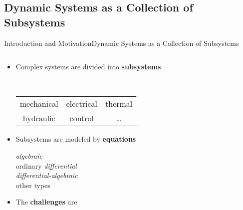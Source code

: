 \subsection{Dynamic Systems as a Collection of Subsystems}

\begin{frame}{Introduction and Motivation}{Dynamic Systems as a Collection of Subsystems}
  \begin{columns}
    \begin{column}[c]{0.6\textwidth}
      \begin{itemize}
        \item<1-> Complex systems are divided into \textbf{subsystems} \\
        \begin{small}
          \quad\, \begin{tabular}{ccc}
            \raisebox{-1pt}{\scalebox{0.8}{\textcolor{fg_sl_color}{\faCogs}}} mechanical &
            \raisebox{-1pt}{\scalebox{0.8}{\textcolor{fg_sl_color}{\faBolt}}} electrical &
            \raisebox{-1pt}{\scalebox{0.8}{\textcolor{fg_sl_color}{\faFire}}} thermal \\
            \raisebox{-1pt}{\scalebox{0.8}{\textcolor{fg_sl_color}{\faOilCan}}} hydraulic &
            \raisebox{-1pt}{\scalebox{0.8}{\textcolor{fg_sl_color}{\faWaveSquare}}} control & \dots
          \end{tabular}
        \end{small}
        \item<2-> Subsystems are modeled by \textbf{equations} \\
        \begin{small}
          \qquad \emph{algebraic} \\
          \qquad ordinary \emph{differential} \\
          \qquad \emph{differential-algebraic} \\
          \qquad other types
        \end{small}
        \item<3-> The \textbf{challenges} are 
      \end{itemize}
    \end{column}
    \begin{column}[c]{0.4\textwidth}
      \centering
    \end{column}
  \end{columns}
\end{frame}

